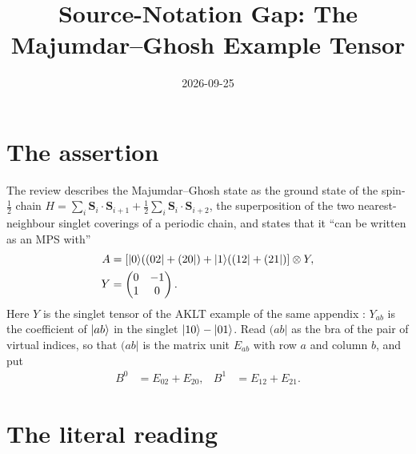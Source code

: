 \documentclass{article}
\title{Source-Notation Gap: The Majumdar--Ghosh Example Tensor}
\author{}
\date{2026-09-25}
\begin{document}
\maketitle
{}

\section{The assertion}

The review describes the Majumdar--Ghosh state as the ground state of the
spin-$\tfrac12$ chain
$H=\sum_i\mathbf S_i\cdot\mathbf S_{i+1}+\tfrac12\sum_i\mathbf S_i\cdot\mathbf S_{i+2}$,
the superposition of the two nearest-neighbour singlet coverings of a periodic
chain, and states that it ``can be written as an MPS with''
\cite[lines~2397--2405]{Cirac2021Matrix}
\begin{align}
    A
        &=
        \left[|0\rangle((02|+(20|)
            +
            |1\rangle((12|+(21|)\right]\otimes Y,
    \label{eq:rmp_majumdar_ghosh_tensor_gap_review_tensor}\\
    Y
        &=
        \begin{pmatrix}
            0 & -1\\
            1 & 0
        \end{pmatrix}.
    \label{eq:rmp_majumdar_ghosh_tensor_gap_singlet_matrix}
\end{align}
Here $Y$ is the singlet tensor of the AKLT example of the same appendix
\cite[lines~2380--2383]{Cirac2021Matrix}: $Y_{ab}$ is the coefficient of
$|ab\rangle$ in the singlet $|10\rangle-|01\rangle$. Read $(ab|$ as the bra of the pair
of virtual indices, so that $(ab|$ is the matrix unit $E_{ab}$ with row $a$ and
column $b$, and put
\begin{align}
    B^0
        &=
        E_{02}+E_{20},
    &
    B^1
        &=
        E_{12}+E_{21}.
    \label{eq:rmp_majumdar_ghosh_tensor_gap_auxiliary_matrices}
\end{align}

\section{The literal reading}
\end{document}

